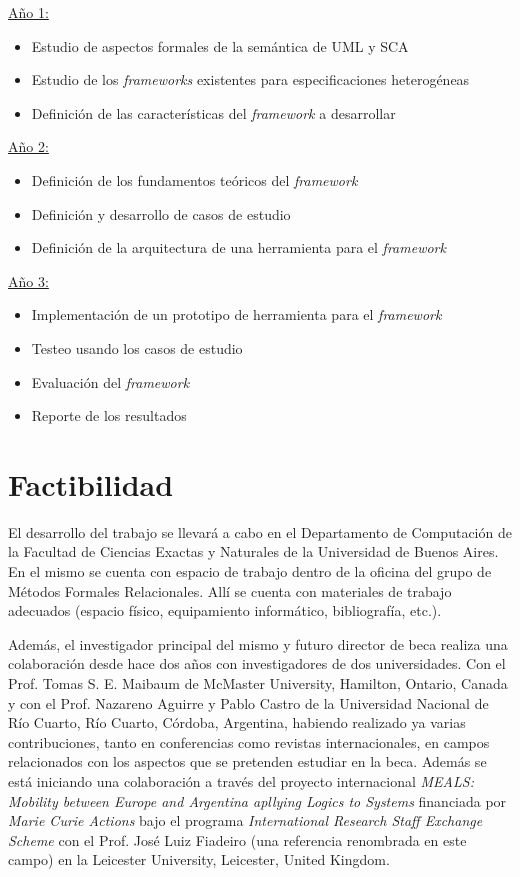 \documentclass[a4paper, 11pt]{article}
\begin{document}
\begin{multicols}{3}

 \underline{Año 1:}
 \begin{itemize}
  \item Estudio de aspectos formales de la semántica de UML y SCA
  \item Estudio de los \emph{frameworks} existentes para especificaciones heterogéneas
  \item Definición de las características del \emph{framework} a desarrollar
 \end{itemize}

 \underline{Año 2:}
 \begin{itemize}
  \item Definición de los fundamentos teóricos del \emph{framework}
  \item Definición y desarrollo de casos de estudio
  \item Definición de la arquitectura de una herramienta para el \emph{framework}
 \end{itemize}
 
 \underline{Año 3:}
 \begin{itemize}
  \item Implementación de un prototipo de herramienta para el \emph{framework}
  \item Testeo usando los casos de estudio
  \item Evaluación del \emph{framework}
  \item Reporte de los resultados
 \end{itemize}
 
\end{multicols}

\section{Factibilidad}

El desarrollo del trabajo se llevará a cabo en el Departamento de Computación de la Facultad de Ciencias Exactas y Naturales de la Universidad de Buenos Aires. En el mismo se cuenta con espacio de trabajo dentro de la oficina del grupo de Métodos Formales Relacionales. Allí se cuenta con materiales de trabajo adecuados (espacio físico, equipamiento informático, bibliografía, etc.).

Además, el investigador principal del mismo y futuro director de beca realiza una colaboración desde hace dos años con investigadores de dos universidades. Con el Prof. Tomas S. E. Maibaum de McMaster University, Hamilton, Ontario, Canada y con el Prof. Nazareno Aguirre y Pablo Castro de la Universidad Nacional de Río Cuarto, Río Cuarto, Córdoba, Argentina, habiendo realizado ya varias contribuciones, tanto en conferencias como revistas internacionales, en campos relacionados con los aspectos que se pretenden estudiar en la beca. Además se está iniciando una colaboración a través del proyecto internacional \emph{MEALS: Mobility between Europe and Argentina apllying Logics to Systems} financiada por \emph{Marie Curie Actions} bajo el programa \emph{International Research Staff Exchange Scheme} con el Prof. José Luiz Fiadeiro (una referencia renombrada en este campo) en la Leicester University, Leicester, United Kingdom.
\end{document}
